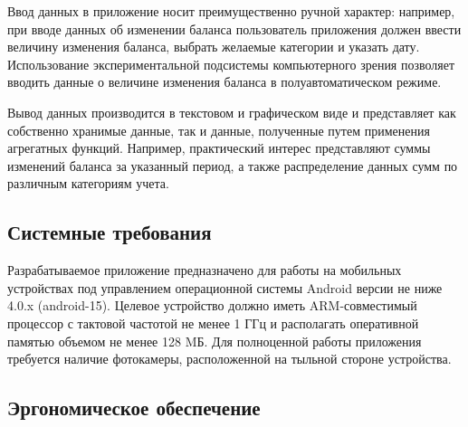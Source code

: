 Ввод данных в приложение носит преимущественно ручной характер:
например, при вводе данных об изменении баланса
пользователь приложения должен ввести величину изменения баланса,
выбрать желаемые категории и указать дату.
Использование экспериментальной подсистемы компьютерного зрения
позволяет вводить данные о величине изменения баланса в
полуавтоматическом режиме.

Вывод данных производится в текстовом и графическом виде и
представляет как собственно хранимые данные, так и данные, полученные путем
применения агрегатных функций. Например, практический интерес представляют
суммы изменений баланса за указанный период, а также распределение
данных сумм по различным категориям учета.





\subsection{Системные требования}

Разрабатываемое приложение предназначено для работы на мобильных устройствах
под управлением операционной системы Android версии не ниже 4.0.x (android-15).
Целевое устройство должно иметь ARM-совместимый процессор с тактовой частотой не менее
1 ГГц и располагать оперативной памятью объемом не менее 128 MБ.
Для полноценной работы приложения требуется наличие фотокамеры,
расположенной на тыльной стороне устройства.

\subsection{Эргономическое обеспечение}

